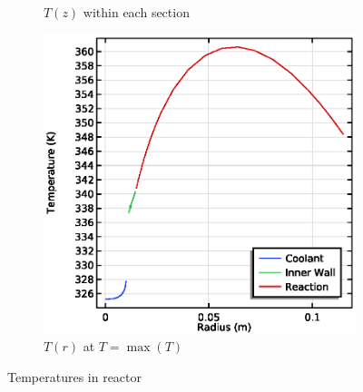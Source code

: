 \begin{figure}[h]
\begin{subfigure}{0.32\linewidth}
        \caption{$T(z)$ within each section}
        \label{fig:comsol-temperature:lines}
    \end{subfigure}
    \begin{subfigure}{0.32\linewidth}
        \includegraphics[width=\linewidth]{figures/Tr-maxT.eps}
        \caption{$T(r)$ at $T = \max(T)$}
        \label{fig:comsol-temperature:radial}
    \end{subfigure}

    \caption{Temperatures in reactor}
    \label{fig:comsol-temperature}
\end{figure}